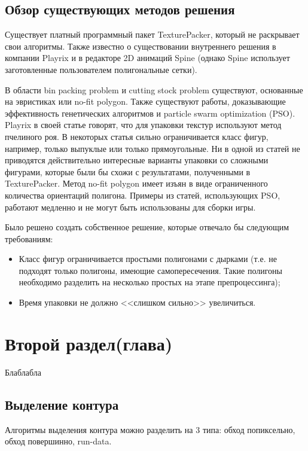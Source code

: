 \documentclass{fefu_thesis/cls/fefu}
\begin{document}
    \subsection{Обзор существующих методов решения}
    Существует платный программный пакет TexturePacker\cite{TexturePacker}, который не раскрывает свои алгоритмы. Также известно о существовании внутреннего решения в компании Playrix\cite{PlayrixArticle} и в редакторе 2D анимаций Spine\cite{Spine} (однако Spine использует заготовленные пользователем полигональные сетки).

    В области bin packing problem и cutting stock problem существуют, основанные на эвристиках\cite{Heuristic1}\cite{Heuristic2}\cite{Heuristic3} или no-fit polygon\cite{NFP1}\cite{NFP2}. Также существуют работы, доказывающие эффективность генетических алгоритмов\cite{Genetica1} и particle swarm optimization (PSO)\cite{PSO1}\cite{PSO2}. Playrix в своей статье\cite{PlayrixArticle} говорят, что для упаковки текстур используют метод пчелиного роя. В некоторых статья сильно ограничивается класс фигур, например, только выпуклые или только прямоугольные. Ни в одной из статей не приводятся действительно интересные варианты упаковки со сложными фигурами, которые были бы схожи с результатами, полученными в TexturePacker. Метод no-fit polygon имеет изъян в виде ограниченного количества ориентаций полигона. Примеры из статей, использующих PSO, работают медленно и не могут быть использованы для сборки игры.

    Было решено создать собственное решение, которые отвечало бы следующим требованиям:
    \begin{itemize}
        \item Класс фигур ограничивается простыми полигонами с дырками (т.е. не подходят только полигоны, имеющие самопересечения. Такие полигоны необходимо разделить на несколько простых на этапе препроцессинга);
        \item Время упаковки не должно <<слишком сильно>> увеличиться.
    \end{itemize}
    \section{Второй раздел(глава)}
    Блаблабла
    \subsection{Выделение контура}
    Алгоритмы выделения контура можно разделить на 3 типа: обход попиксельно, обход повершинно, run-data.
\end{document}

